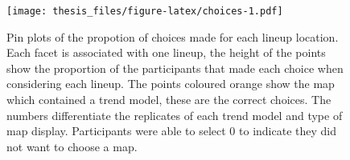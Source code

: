 \documentclass{monashthesis}
\begin{document}
\begin{figure}
\centering
\texttt{[image: thesis\_files/figure-latex/choices-1.pdf]}
\caption{\label{fig:choices}Pin plots of the propotion of choices made for each lineup location. Each facet is associated with one lineup, the height of the points show the proportion of the participants that made each choice when considering each lineup. The points coloured orange show the map which contained a trend model, these are the correct choices. The numbers differentiate the replicates of each trend model and type of map display. Participants were able to select 0 to indicate they did not want to choose a map.}
\end{figure}

\begin{Shaded}
\end{Shaded}
\end{document}
